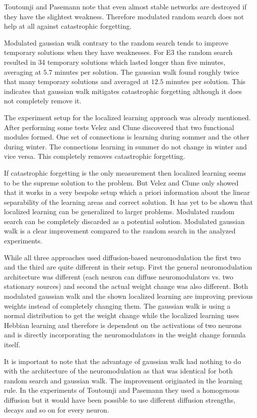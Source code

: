 \documentclass[12pt,twoside]{scrartcl}
\theoremstyle{plain}
\theoremstyle{definition}
\theoremstyle{remark}
\begin{document}
Toutounji and Pasemann note that even almost stable networks are destroyed
if they have the slightest weakness. Therefore modulated random search
does not help at all against catastrophic forgetting.

Modulated gaussian walk contrary to the random search tends to improve temporary
solutions when they have weaknesses. For E3 the random search resulted in 34
temporary solutions which lasted longer than five minutes, averaging at \(5.7\)
minutes per solution. The gaussian walk found roughly twice that many temporary
solutions and averaged at \(12.5\) minutes per solution. This indicates that
gaussian walk mitigates catastrophic forgetting although it does not completely
remove it.

The experiment setup for the localized learning approach was already mentioned.
After performing some tests Velez and Clune discovered that two functional
modules formed. One set of connections is learning during sommer and the other
during winter. The connections learning in summer do not change in winter and
vice versa. This completely removes catastrophic forgetting.

If catastrophic forgetting is the only measurement then localized learning
seems to be the supreme solution to the problem. But Velez and Clune only
showed that it works in a very bespoke setup which a priori information about
the linear separability of the learning areas and correct solution. It has yet
to be shown that localized learning can be generalized to larger problems.
Modulated random search can be completely discarded as a potential solution.
Modulated gaussian walk is a clear improvement compared to the random search
in the analyzed experiments.

While all three approaches used diffusion-based neuromodulation the first two and
the third are quite different in their setup. First the general neuromodulation
architecture was different (each neuron can diffuse neuromodulators vs. two stationary
sources) and second the actual weight change was also different. Both modulated
gaussian walk and the shown localized learning are improving previous weights
instead of completely changing them. The gaussian walk is using a normal distribution
to get the weight change while the localized learning uses Hebbian learning and
therefore is dependent on the activations of two neurons and is directly incorporating
the neuromodulators in the weight change formula itself.

It is important to note that the advantage of gaussian walk had nothing to do
with the architecture of the neuromodulation as that was identical for both
random search and gaussian walk. The improvement originated in the learning
rule. In the experiments of Toutounji and Pasemann they used a homogenous
diffusion but it would have been possible to use different diffusion strengths,
decays and so on for every neuron.
\end{document}
